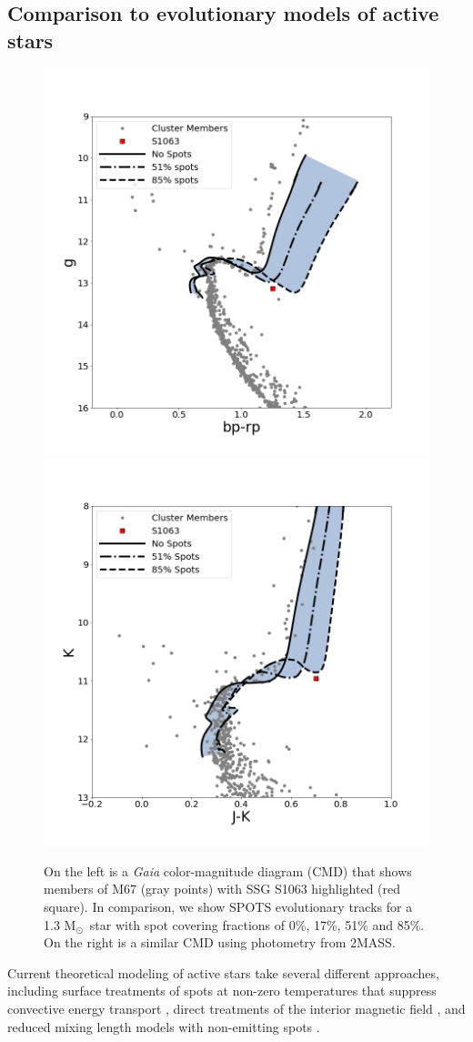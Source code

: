 \documentclass[modern,trackchanges]{aastex631}
\newcommand{\Msolar}{M$_{\odot}$}
\begin{document}
 \subsection{Comparison to evolutionary models of active stars}
 \label{sec:model_comparison}

\begin{figure}[ht]
    \centering
    \includegraphics[width=0.45\linewidth]{figures/S1063_GaiaCMD.png}
    \includegraphics[width=0.45\linewidth]{figures/S1063_2MASS_CMD.png}
    \caption{On the left is a \textit{Gaia} color-magnitude diagram (CMD) that shows members of M67 (gray points) with SSG S1063 highlighted (red square). In comparison, we show SPOTS evolutionary tracks \citep{somers20} for a 1.3 \Msolar\ star with spot covering fractions of 0\%, 17\%, 51\% and 85\%. On the right is a similar CMD using photometry from 2MASS.}
    \label{fig:CMDs}
\end{figure}

Current theoretical modeling of active stars take several different approaches, including surface treatments of spots at non-zero temperatures that suppress convective energy transport \citep{somers20}, direct treatments of the interior magnetic field \citep{2013ApJ...779..183F}, and reduced mixing length models with non-emitting spots \citep{2007A&A...472L..17C}. 
\end{document}
